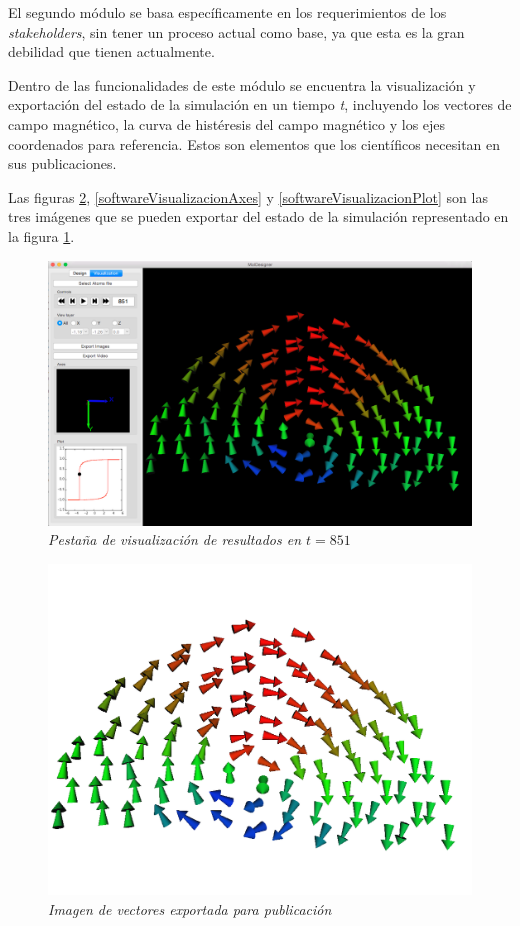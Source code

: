 El segundo módulo se basa específicamente en los requerimientos de los \emph{stakeholders}, sin tener un proceso actual como base, ya que esta es la gran debilidad que tienen actualmente.

Dentro de las funcionalidades de este módulo se encuentra la visualización y exportación del estado de la simulación en un tiempo \emph{t}, incluyendo los vectores de campo magnético, la curva de histéresis del campo magnético y los ejes coordenados para referencia. Estos son elementos que los científicos necesitan en sus publicaciones.

Las figuras \ref{softwareVisualizacionVectors}, \ref{softwareVisualizacionAxes} y \ref{softwareVisualizacionPlot} son las tres imágenes que se pueden exportar del estado de la simulación representado en la figura \ref{softwareVisualizacionPantalla}.


\begin{figure}[ht]
  \centering
  \includegraphics[scale=.3]{images/softwareVisualizacionPantalla}
  \caption{\em Pestaña de visualización de resultados en $t = 851$}
  \label{softwareVisualizacionPantalla}
\end{figure}


\begin{figure}[ht]
  \centering
  \includegraphics[scale=.3]{images/softwareVisualizacionVectors}
  \caption{\em Imagen de vectores exportada para publicación}
  \label{softwareVisualizacionVectors}
\end{figure}


